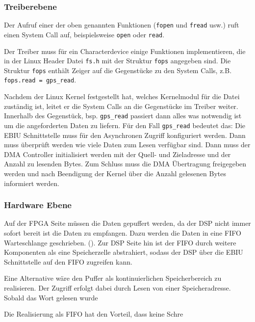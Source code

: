 
\subsubsection{Treiberebene}
Der Aufruf einer der oben genannten Funktionen (\lstinline$fopen$ und \lstinline$fread$ usw.) ruft einen System Call auf, beispielsweise  \lstinline$open$ oder \lstinline$read$. 

Der Treiber muss für ein Characterdevice einige Funktionen implementieren, die in der Linux Header Datei \lstinline$fs.h$ mit der Struktur \lstinline$fops$ angegeben sind. Die Struktur \lstinline$fops$ enthält Zeiger auf die Gegenstücke zu den System Calls, z.B. \lstinline$fops.read = gps_read$.

Nachdem der Linux Kernel festgestellt hat, welches Kernelmodul für die Datei zuständig ist, leitet er die System Calls an die Gegenstücke im Treiber weiter. Innerhalb des Gegenstück, bsp. \lstinline$gps_read$ passiert dann alles was notwendig ist um die angeforderten Daten zu liefern. Für den Fall \lstinline$gps_read$ bedeutet das: Die EBIU Schnittstelle muss für den Asynchronen Zugriff konfiguriert werden. Dann muss überprüft werden wie viele Daten zum Lesen verfügbar sind. Dann muss der DMA Controller initialisiert werden mit der Quell- und Zieladresse und der Anzahl zu lesenden Bytes. Zum Schluss muss die DMA Übertragung freigegeben werden und nach Beendigung der Kernel über die Anzahl gelesenen Bytes informiert werden.

\subsubsection{Hardware Ebene}
Auf der FPGA Seite müssen die Daten gepuffert werden, da der DSP nicht immer sofort bereit ist die Daten zu empfangen. Dazu werden die Daten in eine \gls{FIFO} Warteschlange geschrieben. (). Zur DSP Seite hin ist der FIFO durch weitere Komponenten als eine Speicherzelle abstrahiert, sodass der DSP über die EBIU Schnittstelle auf den FIFO zugreifen kann. 

Eine Alternative wäre den Puffer als kontinuierlichen Speicherbereich zu realisieren. 
Der Zugriff erfolgt dabei durch Lesen von einer Speicheradresse. Sobald das Wort gelesen wurde 

Die Realisierung als FIFO hat den Vorteil, dass keine Schre

